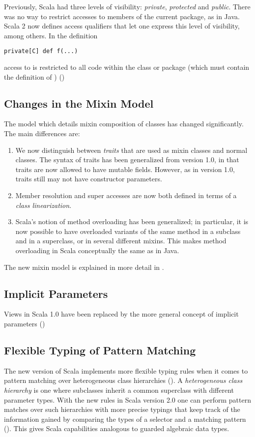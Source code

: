 Previously, Scala had three levels of visibility: {\em private},
{\em protected} and {\em public}. There was no way to
restrict accesses to members of the current package, as in Java. Scala
2 now defines access qualifiers that let one express this level of
visibility, among others. In the definition
\begin{lstlisting}
private[C] def f(...)
\end{lstlisting}
access to \lstinline@f@ is restricted to all code within the class or
package \lstinline@C@ (which must contain the definition of
\lstinline@f@) ()

\subsection*{Changes in the Mixin Model}\label{sec:mixin-classes}

The model which details mixin composition of classes has changed
significantly. The main differences are:
\begin{enumerate}
\item
We now distinguish between {\em traits} that are used as mixin classes
and normal classes. The syntax of traits has been generalized from
version 1.0, in that traits are now allowed to have mutable
fields. However, as in version 1.0, traits still may not have
constructor parameters.
\item
Member resolution and super accesses are now both defined in terms of
a {\em class linearization}. 
\item
Scala's notion of method overloading has been generalized; in
 particular, it is now possible to have overloaded variants of the
 same method in a subclass and in a superclass, or in several different
 mixins. This makes method overloading in Scala conceptually the
 same as in Java.
\end{enumerate}
The new mixin model is explained in more detail in
.

\subsection*{Implicit Parameters}

Views in Scala 1.0 have been replaced by the more general concept of
implicit parameters ()

\subsection*{Flexible Typing of Pattern Matching}

The new version of Scala implements more flexible typing rules when it
comes to pattern matching over heterogeneous class hierarchies
(). A {\em heterogeneous class hierarchy} is
one where subclasses inherit a common superclass with different
parameter types.  With the new rules in Scala version 2.0 one can
perform pattern matches over such hierarchies with more precise
typings that keep track of the information gained by comparing the
types of a selector and a matching pattern ().
This gives Scala capabilities analogous to guarded algebraic data types.



